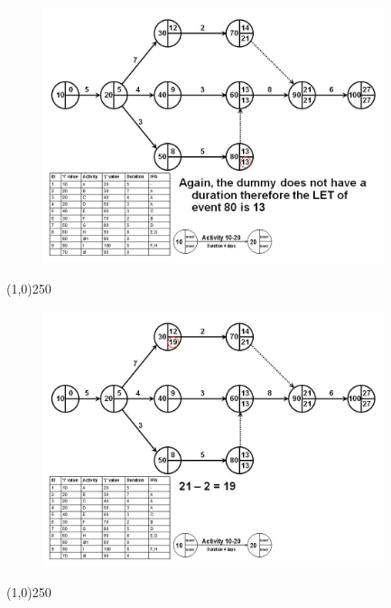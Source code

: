 \begin{frame}
\begin{figure}
	\centering
		\includegraphics[width = 10.0cm]{oldnotes/Slide115.jpg}
\end{figure}
\end{frame}
\begin{center}\line(1,0){250}\end{center}


\begin{frame}
\begin{figure}
	\centering
		\includegraphics[width = 10.0cm]{oldnotes/Slide116.jpg}
\end{figure}
\end{frame}
\begin{center}\line(1,0){250}\end{center}


